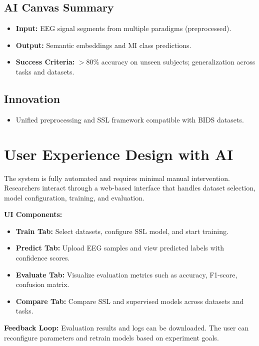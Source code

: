 \subsection{AI Canvas Summary}
\label{subsec:ai-canvas-summary}
\begin{itemize}[leftmargin=3.5em]
    \item \textbf{Input:} EEG signal segments from multiple paradigms (preprocessed).
    \item \textbf{Output:} Semantic embeddings and MI class predictions.
    \item \textbf{Success Criteria:} $>$80\% accuracy on unseen subjects; generalization across tasks and datasets.
\end{itemize}

\subsection{Innovation}
\label{subsec:innovation}
\begin{itemize}[leftmargin=3.5em]
    \item Unified preprocessing and SSL framework compatible with BIDS datasets.
\end{itemize}

\section{User Experience Design with AI}
\label{sec:ux-ai}

The system is fully automated and requires minimal manual intervention. Researchers interact through a web-based interface that handles dataset selection, model configuration, training, and evaluation.

\vspace{0.5em}
\noindent\textbf{UI Components:}
\begin{itemize}
    \item \textbf{Train Tab:} Select datasets, configure SSL model, and start training.
    \item \textbf{Predict Tab:} Upload EEG samples and view predicted labels with confidence scores.
    \item \textbf{Evaluate Tab:} Visualize evaluation metrics such as accuracy, F1-score, confusion matrix.
    \item \textbf{Compare Tab:} Compare SSL and supervised models across datasets and tasks.
\end{itemize}

\vspace{0.5em}
\noindent\textbf{Feedback Loop:}
Evaluation results and logs can be downloaded.
The user can reconfigure parameters and retrain models based on experiment goals.

